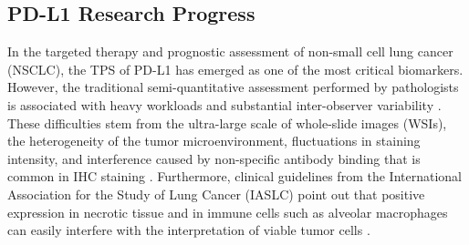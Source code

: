 \documentclass[journal]{vgtc}                     %
\begin{document}
\subsection{PD-L1 Research Progress}


In the targeted therapy and prognostic assessment of non-small cell lung cancer (NSCLC), the TPS of PD-L1 has emerged as one of the most critical biomarkers\cite{herbst2014predictive}. However, the traditional semi-quantitative assessment performed by pathologists is associated with heavy workloads and substantial inter-observer variability \cite{huang2025pd}. These difficulties stem from the ultra-large scale of whole-slide images (WSIs), the heterogeneity of the tumor microenvironment, fluctuations in staining intensity, and interference caused by non-specific antibody binding that is common in IHC staining \cite{somarakis2021visual}. Furthermore, clinical guidelines from the International Association for the Study of Lung Cancer (IASLC) point out that positive expression in necrotic tissue and in immune cells such as alveolar macrophages can easily interfere with the interpretation of viable tumor cells \cite{tsao2017iaslc}.
\end{document}
